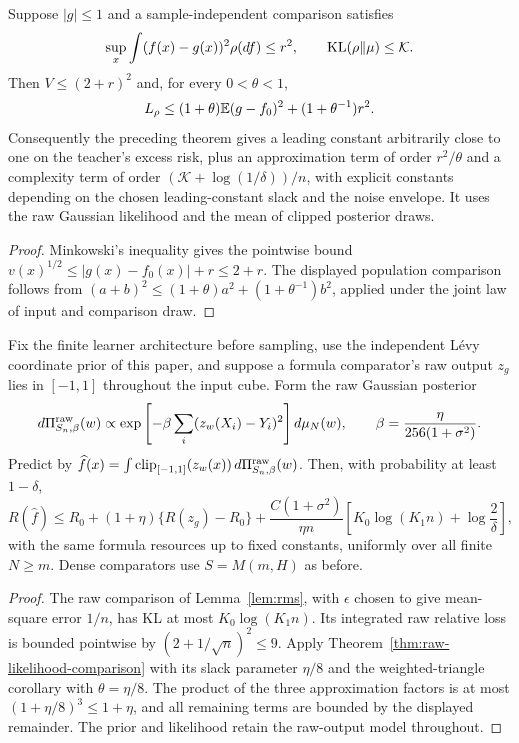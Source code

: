 \begin{corollary}
\label{cor:raw-likelihood-bounded-teacher}
Suppose $|g|\le1$ and a sample-independent comparison satisfies
\[
 \sup_x\int(f(x)-g(x))^2\rho(df)\le r^2,\qquad
 \operatorname{KL}(\rho\|\mu)\le\mathcal K.
\]
Then $V\le(2+r)^2$ and, for every $0<\theta<1$,
\[
 L_\rho\le(1+\theta)\mathbb E(g-f_0)^2+(1+\theta^{-1})r^2.
\]
Consequently the preceding theorem gives a leading constant arbitrarily close to one on the teacher's excess risk, plus an approximation term of order $r^2/\theta$ and a complexity term of order $(\mathcal K+\log(1/\delta))/n$, with explicit constants depending on the chosen leading-constant slack and the noise envelope. It uses the raw Gaussian likelihood and the mean of clipped posterior draws.
\end{corollary}
\begin{proof}
Minkowski's inequality gives the pointwise bound $v(x)^{1/2}\le|g(x)-f_0(x)|+r\le2+r$. The displayed population comparison follows from $(a+b)^2\le(1+\theta)a^2+(1+\theta^{-1})b^2$, applied under the joint law of input and comparison draw.
\end{proof}

\begin{corollary}
Fix the finite learner architecture before sampling, use the independent L\'evy coordinate prior of this paper, and suppose a formula comparator's raw output $z_g$ lies in $[-1,1]$ throughout the input cube. Form the raw Gaussian posterior
\[
 d\Pi^{\rm raw}_{S_n,\beta}(w)\propto
 \exp\left[-\beta\sum_i(z_w(X_i)-Y_i)^2\right]d\mu_N(w),
 \qquad \beta=\frac{\eta}{256(1+\sigma^2)}.
\]
Predict by $\widehat f(x)=\int\operatorname{clip}_{[-1,1]}(z_w(x))\,d\Pi^{\rm raw}_{S_n,\beta}(w)$.
Then, with probability at least $1-\delta$,
\[
 R(\widehat f)\le R_0+(1+\eta)\{R(z_g)-R_0\}
 +\frac{C(1+\sigma^2)}{\eta n}
       \left[K_0\log(K_1n)+\log\frac2\delta\right],
\]
with the same formula resources up to fixed constants, uniformly over all finite $N\ge m$. Dense comparators use $S=M(m,H)$ as before.
\end{corollary}
\begin{proof}
The raw comparison of Lemma~\ref{lem:rms}, with $\epsilon$ chosen to give mean-square error $1/n$, has KL at most $K_0\log(K_1n)$. Its integrated raw relative loss is bounded pointwise by $(2+1/\sqrt n)^2\le9$. Apply Theorem~\ref{thm:raw-likelihood-comparison} with its slack parameter $\eta/8$ and the weighted-triangle corollary with $\theta=\eta/8$. The product of the three approximation factors is at most $(1+\eta/8)^3\le1+\eta$, and all remaining terms are bounded by the displayed remainder. The prior and likelihood retain the raw-output model throughout.
\end{proof}
